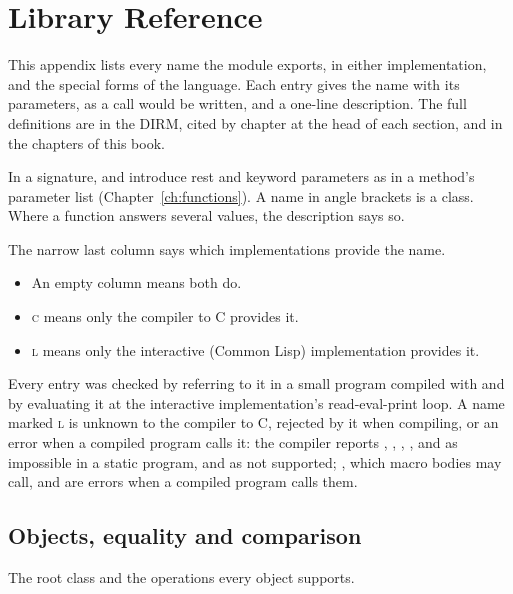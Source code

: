 \chapter{Library Reference}\label{app:library}

This appendix lists every name the module  exports, in
either implementation, and the special forms of the language. Each entry
gives the name with its parameters, as a call would be written, and a
one-line description. The full definitions are in the DIRM, cited by
chapter at the head of each section, and in the chapters of this book.

In a signature,  and  introduce rest and keyword
parameters as in a method's parameter list (Chapter~\ref{ch:functions}).
A name in angle brackets is a class. Where a function answers several
values, the description says so.

The narrow last column says which implementations provide the name.
\begin{itemize}
\item An empty column means both do.
\item \textsc{c} means only the compiler to C provides it.
\item \textsc{l} means only the interactive (Common Lisp) implementation
  provides it.
\end{itemize}

\noindent
Every entry was checked by referring to it in a small program compiled
with  and by evaluating it at the interactive
implementation's read-eval-print loop. A name marked \textsc{l} is
unknown to the compiler to C, rejected by it when compiling, or an error
when a compiled program calls it: the compiler reports
, , ,
,  and
 as impossible in a static program, and
 as not supported; ,
which macro bodies may call,  and
 are errors when a compiled program calls them.

\section{Objects, equality and comparison}\label{sec:lib-objects}

{\sloppy The root class and the operations every object supports.\par}

